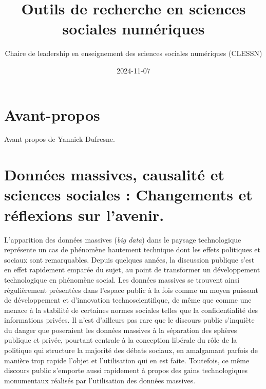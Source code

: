 \documentclass[
  letterpaper,
  DIV=11,
  numbers=noendperiod]{scrreprt}
\title{Outils de recherche en sciences sociales numériques}
\author{Chaire de leadership en enseignement des sciences sociales
numériques (CLESSN)}
\date{2024-11-07}
\renewcommand*\contentsname{Table of contents}
\newcommand\contentsname{Table of contents}
\begin{document}
\maketitle

\renewcommand*\contentsname{Table of contents}
{
\hypersetup{linkcolor=}
\setcounter{tocdepth}{2}
\tableofcontents
}


\chapter*{Avant-propos}\label{avant-propos}


Avant propos de Yannick Dufresne.


\chapter*{Données massives, causalité et sciences sociales : Changements
et réflexions sur
l'avenir.}\label{donnuxe9es-massives-causalituxe9-et-sciences-sociales-changements-et-ruxe9flexions-sur-lavenir.}


L'apparition des données massives (\emph{big data}) dans le paysage
technologique représente un cas de phénomène hautement technique dont
les effets politiques et sociaux sont remarquables. Depuis quelques
années, la discussion publique s'est en effet rapidement emparée du
sujet, au point de transformer un développement technologique en
phénomène social. Les données massives se trouvent ainsi régulièrement
présentées dans l'espace public à la fois comme un moyen puissant de
développement et d'innovation technoscientifique, de même que comme une
menace à la stabilité de certaines normes sociales telles que la
confidentialité des informations privées. Il n'est d'ailleurs pas rare
que le discours public s'inquiète du danger que poseraient les données
massives à la séparation des sphères publique et privée, pourtant
centrale à la conception libérale du rôle de la politique qui structure
la majorité des débats sociaux, en amalgamant parfois de manière trop
rapide l'objet et l'utilisation qui en est faite. Toutefois, ce même
discours public s'emporte aussi rapidement à propos des gains
technologiques monumentaux réalisés par l'utilisation des données
massives.
\end{document}
